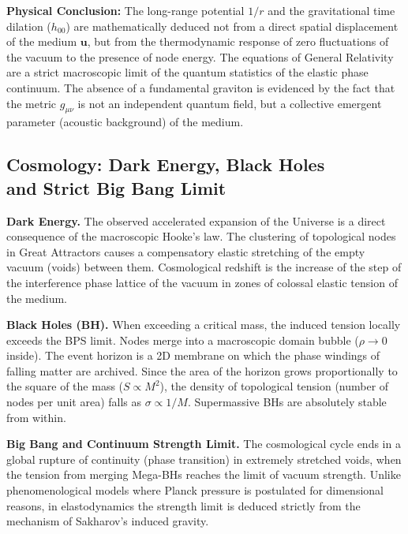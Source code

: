 \documentclass[11pt,a4paper]{article}
\begin{document}
	\textbf{Physical Conclusion:} The long-range potential $1/r$ and the gravitational time dilation ($h_{00}$) are mathematically deduced not from a direct spatial displacement of the medium $\mathbf{u}$, but from the thermodynamic response of zero fluctuations of the vacuum to the presence of node energy. The equations of General Relativity are a strict macroscopic limit of the quantum statistics of the elastic phase continuum. The absence of a fundamental graviton is evidenced by the fact that the metric $g_{\mu\nu}$ is not an independent quantum field, but a collective emergent parameter (acoustic background) of the medium.
	
\subsection{Cosmology: Dark Energy, Black Holes \\ and Strict Big Bang Limit}
	\textbf{Dark Energy.} The observed accelerated expansion of the Universe is a direct consequence of the macroscopic Hooke's law. The clustering of topological nodes in Great Attractors causes a compensatory elastic stretching of the empty vacuum (voids) between them. Cosmological redshift is the increase of the step of the interference phase lattice of the vacuum in zones of colossal elastic tension of the medium.
	
	\textbf{Black Holes (BH).} When exceeding a critical mass, the induced tension locally exceeds the BPS limit. Nodes merge into a macroscopic domain bubble ($\rho \to 0$ inside). The event horizon is a 2D membrane on which the phase windings of falling matter are archived. Since the area of the horizon grows proportionally to the square of the mass ($S \propto M^2$), the density of topological tension (number of nodes per unit area) falls as $\sigma \propto 1/M$. Supermassive BHs are absolutely stable from within.
	
	\textbf{Big Bang and Continuum Strength Limit.} 
	The cosmological cycle ends in a global rupture of continuity (phase transition) in extremely stretched voids, when the tension from merging Mega-BHs reaches the limit of vacuum strength. Unlike phenomenological models where Planck pressure is postulated for dimensional reasons, in elastodynamics the strength limit is deduced strictly from the mechanism of Sakharov's induced gravity.
	
\end{document}
